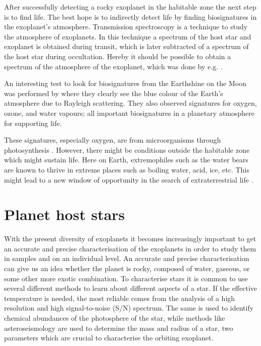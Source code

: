 After successfully detecting a rocky exoplanet in the habitable zone the next step is to find life.
The best hope is to indirectly detect life by finding biosignatures \citep{Kasting2002} in the
exoplanet's atmosphere. Transmission spectroscopy is a technique to study the atmosphere of
exoplanets. In this technique a spectrum of the host star and exoplanet is obtained during transit,
which is later subtracted of a spectrum of the host star during occultation. Hereby it should be
possible to obtain a spectrum of the atmosphere of the exoplanet, which was done by e.g.
\citet{Charbonneau2002}.

An interesting test to look for biosignatures from the Earthshine on the Moon was performed by
\citet{Arnold2002} where they clearly see the blue colour of the Earth's atmosphere due to Rayleigh
scattering. They also observed signatures for oxygen, ozone, and water vapours; all important
biosignatures in a planetary atmosphere for supporting life.

These signatures, especially oxygen, are from microorganisms through photosynthesis \citep[see
e.g.]{Kasting2002}. However, there might be conditions outside the habitable zone which might
sustain life. Here on Earth, extremophiles such as the water bears are known to thrive in extreme
places such as boiling water, acid, ice, etc. This might lead to a new window of opportunity in the
search of extraterrestrial life \citep{Cavicchioli2002}.



\section{Planet host stars}
\label{sec:planet_host_stars}

With the present diversity of exoplanets it becomes increasingly important to get an accurate and
precise characterisation of the exoplanets in order to study them in samples and on an individual
level. An accurate and precise characterisation can give us an idea whether the planet is rocky,
composed of water, gaseous, or some other more exotic combination. To characterise stars it is
common to use several different methods to learn about different aspects of a star. If the effective
temperature is needed, the most reliable comes from the analysis of a high resolution and high
signal-to-noise (S/N) spectrum. The same is used to identify chemical abundances of the photosphere
of the star, while methods like asteroseismology are used to determine the mass and radius of a
star, two parameters which are crucial to characterise the orbiting exoplanet.

